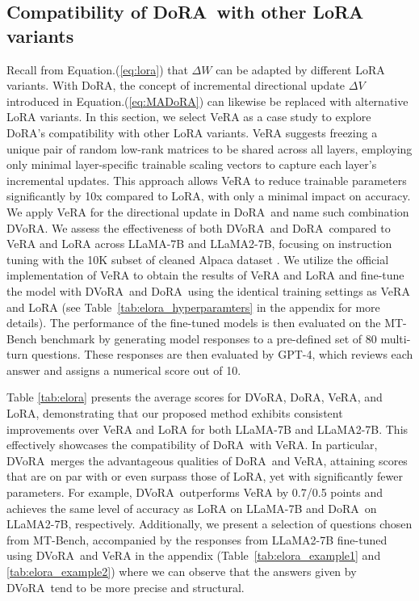 \documentclass{article}
\newcommand{\ours}{DoRA}
\newcommand{\ourss}{DVoRA}
\theoremstyle{plain}
\theoremstyle{definition}
\theoremstyle{remark}
\begin{document}
\subsection{Compatibility of \ours~with other LoRA variants}
\label{sec:elora}

Recall from Equation.(\ref{eq:lora}) that $\Delta W$ can be adapted by different LoRA variants. With \ours, the concept of incremental directional update $\Delta V$ introduced in Equation.(\ref{eq:MADoRA}) can likewise be replaced with alternative LoRA variants. In this section, we select VeRA \cite{kopiczko2023vera} as a case study to explore \ours's compatibility with other LoRA variants. VeRA suggests freezing a unique pair of random low-rank matrices to be shared across all layers, employing only minimal layer-specific trainable scaling vectors to capture each layer's incremental updates. This approach allows VeRA to reduce trainable parameters significantly by 10x compared to LoRA, with only a minimal impact on accuracy. 
We apply VeRA for the directional update in \ours~and name such combination \ourss. We assess the effectiveness of both \ourss~and \ours~compared to VeRA and LoRA across LLaMA-7B and LLaMA2-7B, focusing on instruction tuning with the 10K subset of cleaned Alpaca dataset \cite{alpaca}. We utilize the official implementation of VeRA to obtain the results of VeRA and LoRA and fine-tune the model with \ourss~and \ours~using the identical training settings as VeRA and LoRA (see Table~\ref{tab:elora_hyperparamters} in the appendix for more details). The performance of the fine-tuned models is then evaluated on the MT-Bench benchmark \cite{zheng2023judging} by generating model responses to a pre-defined set of 80 multi-turn questions. These responses are then evaluated by GPT-4, which reviews each answer and assigns a numerical score out of 10. 

Table \ref{tab:elora} presents the average scores for \ourss, \ours, VeRA, and LoRA, demonstrating that our proposed method exhibits consistent improvements over VeRA and LoRA for both LLaMA-7B and LLaMA2-7B. 
This effectively showcases the compatibility of \ours~with VeRA. In particular, \ourss~merges the advantageous qualities of \ours~and VeRA, attaining scores that are on par with or even surpass those of LoRA, yet with significantly fewer parameters. For example, \ourss~outperforms VeRA by 0.7/0.5 points and achieves the same level of accuracy as LoRA on LLaMA-7B and \ours~on LLaMA2-7B, respectively. Additionally, we present a selection of questions chosen from MT-Bench, accompanied by the responses from LLaMA2-7B fine-tuned using \ourss~and VeRA in the appendix (Table~\ref{tab:elora_example1} and \ref{tab:elora_example2}) where we can observe that the answers given by \ourss~tend to be more precise and structural.
\end{document}
